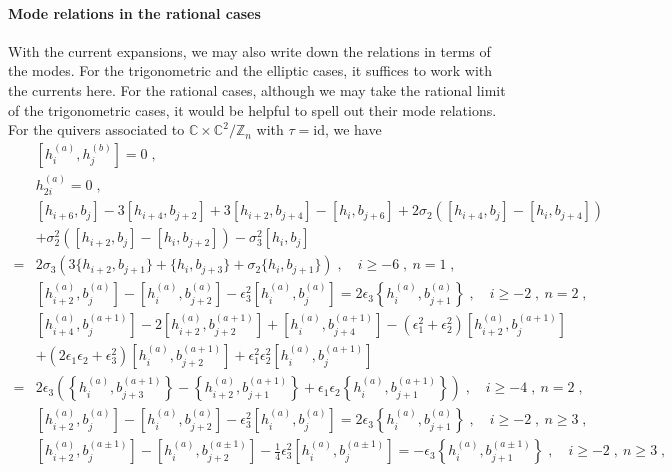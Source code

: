 \documentclass[11pt]{article}
\numberwithin{equation}{section}
\numberwithin{figure}{section}
\numberwithin{table}{section}
\begin{document}
\paragraph{Mode relations in the rational cases} With the current expansions, we may also write down the relations in terms of the modes. For the trigonometric and the elliptic cases, it suffices to work with the currents here. For the rational cases, although we may take the rational limit of the trigonometric cases, it would be helpful to spell out their mode relations. For the quivers associated to $\mathbb{C}\times\mathbb{C}^2/\mathbb{Z}_n$ with $\tau=\mathrm{id}$, we have
\begin{subequations}
	\begin{align}
		&\left[h^{(a)}_i,h^{(b)}_j\right]=0\;,\label{hhcomm}\\
		&h^{(a)}_{2i}=0\;,\label{h2i}\\
		&[h_{i+6},b_j]-3[h_{i+4},b_{j+2}]+3[h_{i+2},b_{j+4}]-[h_i,b_{j+6}]+2\sigma_2([h_{i+4},b_j]-[h_i,b_{j+4}])\nonumber\\
		&+\sigma_2^2([h_{i+2},b_j]-[h_i,b_{j+2}])-\sigma_3^2[h_i,b_j]\nonumber\\
		=&2\sigma_3(3\{h_{i+2},b_{j+1}\}+\{h_i,b_{j+3}\}+\sigma_2\{h_i,b_{j+1}\})\;,\quad i\geq-6\;,~n=1\;,\label{hbn1}\\
		&\left[h^{(a)}_{i+2},b^{(a)}_j\right]-\left[h^{(a)}_i,b^{(a)}_{j+2}\right]-\epsilon_3^2\left[h^{(a)}_i,b^{(a)}_j\right]=2\epsilon_3\left\{h^{(a)}_i,b^{(a)}_{j+1}\right\}\;,\quad i\geq-2\;,~n=2\;,\label{hbn2aa}\\
		&\left[h^{(a)}_{i+4},b^{(a+1)}_j\right]-2\left[h^{(a)}_{i+2},b^{(a+1)}_{j+2}\right]+\left[h^{(a)}_i,b^{(a+1)}_{j+4}\right]-\left(\epsilon_1^2+\epsilon_2^2\right)\left[h^{(a)}_{i+2},b^{(a+1)}_j\right]\nonumber\\
		&+\left(2\epsilon_1\epsilon_2+\epsilon_3^2\right)\left[h^{(a)}_i,b^{(a+1)}_{j+2}\right]+\epsilon_1^2\epsilon_2^2\left[h^{(a)}_i,b^{(a+1)}_j\right]\nonumber\\
		=&2\epsilon_3\left(\left\{h^{(a)}_i,b^{(a+1)}_{j+3}\right\}-\left\{h^{(a)}_{i+2},b^{(a+1)}_{j+1}\right\}+\epsilon_1\epsilon_2\left\{h^{(a)}_i,b^{(a+1)}_{j+1}\right\}\right)\;,\quad i\geq-4\;,~n=2\;,\label{hbn2aa+1}\\
		&\left[h^{(a)}_{i+2},b^{(a)}_j\right]-\left[h^{(a)}_i,b^{(a)}_{j+2}\right]-\epsilon_3^2\left[h^{(a)}_i,b^{(a)}_j\right]=2\epsilon_3\left\{h^{(a)}_i,b^{(a)}_{j+1}\right\}\;,\quad i\geq-2\;,~n\geq3\;,\label{hbn3aa}\\
		&\left[h^{(a)}_{i+2},b^{(a\pm1)}_j\right]-\left[h^{(a)}_i,b^{(a\pm1)}_{j+2}\right]-\frac{1}{4}\epsilon_3^2\left[h^{(a)}_i,b^{(a\pm1)}_j\right]=-\epsilon_3\left\{h^{(a)}_i,b^{(a\pm1)}_{j+1}\right\}\;,\quad i\geq-2\;,~n\geq3\;,\label{hbn3aa+-1}\\

\end{align}
\end{subequations}
\end{document}
